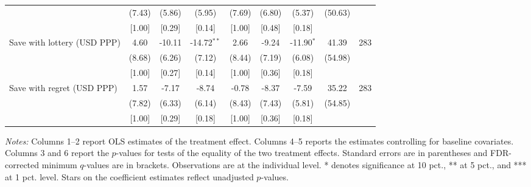 \begin{table}[h]
{\begin{threeparttable}
\begin{tabular}{l*{8}{c}}
          &   (7.43)&   (5.86)&   (5.95)&   (7.69)&   (6.80)&   (5.37)&  (50.63)&         \\
          &   [1.00]&   [0.29]&   [0.14]&   [1.00]&   [0.48]&   [0.18]&         &         \\
Save with lottery (USD PPP)&     4.60&   -10.11&-14.72$^{**}$&     2.66&    -9.24&-11.90$^{*}$&    41.39&      283\\
          &   (8.68)&   (6.26)&   (7.12)&   (8.44)&   (7.19)&   (6.08)&  (54.98)&         \\
          &   [1.00]&   [0.27]&   [0.14]&   [1.00]&   [0.36]&   [0.18]&         &         \\
Save with regret (USD PPP)&     1.57&    -7.17&    -8.74&    -0.78&    -8.37&    -7.59&    35.22&      283\\
          &   (7.82)&   (6.33)&   (6.14)&   (8.43)&   (7.43)&   (5.81)&  (54.85)&         \\
          &   [1.00]&   [0.29]&   [0.18]&   [1.00]&   [0.36]&   [0.18]&         &         \\
\bottomrule \end{tabular} \begin{tablenotes}[flushleft] \footnotesize \item \emph{Notes:} Columns 1--2 report OLS estimates of the treatment effect. Columns 4--5 reports the estimates controlling for baseline covariates. Columns 3 and 6 report the \(p\)-values for tests of the equality of the two treatment effects. Standard errors are in parentheses and FDR-corrected minimum \(q\)-values are in brackets. Observations are at the individual level. * denotes significance at 10 pct., ** at 5 pct., and *** at 1 pct. level. Stars on the coefficient estimates reflect unadjusted \(p\)-values. \end{tablenotes} \end{threeparttable} } \end{table}

